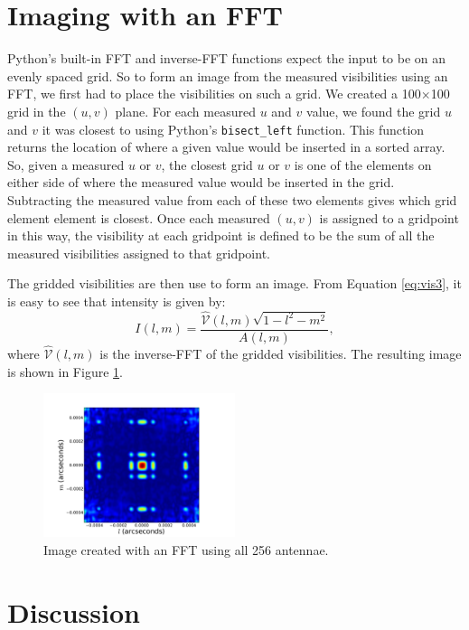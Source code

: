 \documentclass[11pt,letterpaper]{article}
\begin{document}
\section{Imaging with an FFT}
Python's built-in FFT and inverse-FFT functions expect the input 
to be on an evenly spaced grid.  So to form an image from the 
measured visibilities using an FFT, we first had to place the 
visibilities on such a grid.  We created a 100$\times$100 grid in 
the $(u,v)$ plane.  For each measured $u$ and $v$ value, we found the 
grid $u$ and $v$ it was closest to using Python's \texttt{bisect\_left} 
function.  This function returns the location of where a given value 
would be inserted in a sorted array.  So, given a measured $u$ or $v$, 
the closest grid $u$ or $v$ is one of the elements on either side of 
where the measured value would be inserted in the grid.  Subtracting the 
measured value from each of these two elements gives which grid element 
element is closest.  Once each measured $(u,v)$ is assigned to a 
gridpoint in this way, the visibility at each gridpoint is defined 
to be the sum of all the measured visibilities assigned to that gridpoint.

The gridded visibilities are then use to form an image.  From Equation 
\ref{eq:vis3}, it is easy to see that intensity is given by:
\begin{equation}
I(l,m)=\frac{\hat{\mathcal{V}}(l,m)\sqrt{1-l^2-m^2}}{A(l,m)},
\end{equation}
where $\hat{\mathcal{V}}(l,m)$ is the inverse-FFT of the gridded 
visibilities.  The resulting image is shown in Figure \ref{fig:fft}.

\begin{figure}[!h]
\centering
\includegraphics[width=0.5\textwidth]{FFT_Image.pdf}
\caption{Image created with an FFT using all 256 antennae.}
\label{fig:fft}
\end{figure}


\section{Discussion}
\end{document}
